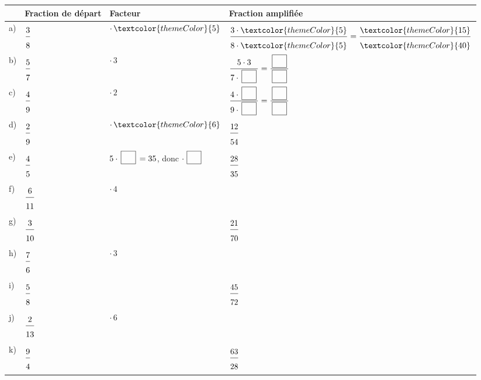\def\arraystretch{3}
\begin{tabularx}{\linewidth}{|>{\centering\arraybackslash}p{0.8cm}|>{\centering\arraybackslash}X|>{\centering\arraybackslash}X|>{\centering\arraybackslash}X|}
\hline
\cellcolor{themeNO!30} & \cellcolor{themeNO!30}\textbf{Fraction de départ} & \cellcolor{themeNO!30}\textbf{Facteur} & \cellcolor{themeNO!30}\textbf{Fraction amplifiée} \\\hline
a) & $\FA{3}{8}$ & $\cdot\, \textcolor{themeColor}{5}$ & $\FA{3 \cdot \textcolor{themeColor}{5}}{8 \cdot \textcolor{themeColor}{5}}=\FA{\textcolor{themeColor}{15}}{\textcolor{themeColor}{40}}$ \\\hline
b) & $\FA{5}{7}$ & $\cdot\, 3$ & $\FA{5 \cdot 3}{7 \cdot \CaseC}=\FA{\CaseC}{\CaseC}$ \\\hline
c) & $\FA{4}{9}$ & $\cdot\, 2$ & $\FA{4 \cdot \CaseC}{9 \cdot \CaseC}=\FA{\CaseC}{\CaseC}$ \\\hline
d) & $\FA{2}{9}$ & $\cdot\, \textcolor{themeColor}{6}$ & $\FA{12}{54}$ \\\hline
e) & $\FA{4}{5}$ & $5 \cdot \CaseC = 35$, donc $\cdot\, \CaseC$ & $\FA{28}{35}$ \\\hline
f) & $\FA{6}{11}$ & $\cdot\, 4$ & \\\hline
g) & $\FA{3}{10}$ & & $\FA{21}{70}$ \\\hline
h) & $\FA{7}{6}$ & $\cdot\, 3$ & \\\hline
i) & $\FA{5}{8}$ & & $\FA{45}{72}$ \\\hline
j) & $\FA{2}{13}$ & $\cdot\, 6$ & \\\hline
k) & $\FA{9}{4}$ & & $\FA{63}{28}$ \\\hline
\end{tabularx}
\def\arraystretch{1}

\newpage
{}

